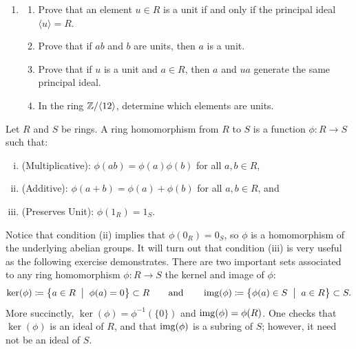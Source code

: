 \documentclass[12pt,reqno]{amsart}
\begin{document}
 \hrulefill 

\begin{enumerate}[leftmargin=*]
\item 
	\begin{enumerate}[label=(\alph*),ref=\theenumi\alph*]
		\item Prove that an element $u \in R$ is a unit if and only if the principal ideal $\langle u \rangle = R$.
		\item Prove that if $ab$ and $b$ are units, then $a$ is a unit.
		\item Prove that if $u$ is a unit and $a \in R$, then $a$ and $ua$ generate the same principal ideal.
		\item In the ring $\mathbb{Z}/\langle 12 \rangle$, determine which elements are units.
	\end{enumerate}
\end{enumerate}

 \hrulefill 

Let $R$ and $S$ be rings. A ring homomorphism from $R$ to $S$ is a function $\phi:R \to S$ such that:
\begin{enumerate}[(i)]
	\item (Multiplicative): $\phi(ab) = \phi(a)\phi(b)$ for all $a,b\in R$,
	\item (Additive): $\phi(a+b) = \phi(a)+\phi(b)$ for all $a,b\in R$, and
	\item (Preserves Unit): $\phi(1_R) = 1_S$.
\end{enumerate}
Notice that condition (ii) implies that $\phi(0_R) = 0_S$, so $\phi$ is a homomorphism of the underlying abelian groups. It will turn out that condition (iii) is very useful as the following exercise demonstrates. There are two important sets associated to any ring homomorphism $\phi:R \to S$ the kernel and image of $\phi$:
\[
\ker(\phi) \coloneqq \left\{ a \in R \;\; \big| \; \; \phi(a) = 0 \right\}\subset R \quad \quad \text{and} \quad \quad \operatorname{img}(\phi) \coloneqq \left\{ \phi(a) \in S \;\; \big| \; \; a\in R\right\} \subset S.
\]
More succinctly, $\ker(\phi) = \phi^{-1}(\{0\})$ and $\operatorname{img}(\phi) = \phi(R)$. One checks that $\ker(\phi)$ is an ideal of $R$, and that $\operatorname{img}(\phi)$ is a subring of $S$; however, it need not be an ideal of $S$. 

 \hrulefill 
\end{document}
